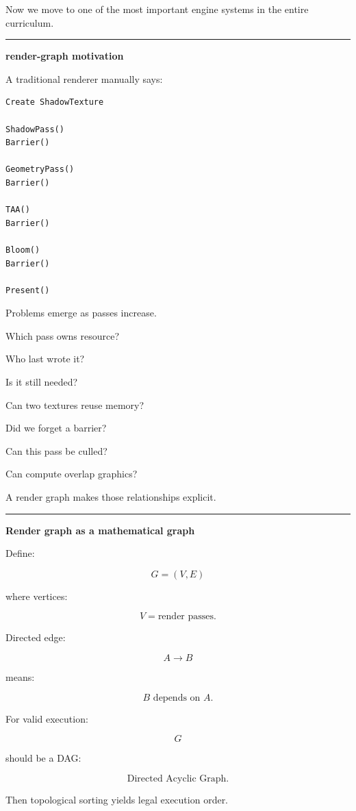 Now we move to one of the most important engine systems in the entire curriculum.

\begin{center}\rule{0.5\linewidth}{0.5pt}\end{center}

\textbf{render-graph motivation}

A traditional renderer manually says:

\begin{verbatim}
Create ShadowTexture

ShadowPass()
Barrier()

GeometryPass()
Barrier()

TAA()
Barrier()

Bloom()
Barrier()

Present()
\end{verbatim}

Problems emerge as passes increase.

Which pass owns resource?

Who last wrote it?

Is it still needed?

Can two textures reuse memory?

Did we forget a barrier?

Can this pass be culled?

Can compute overlap graphics?

A render graph makes those relationships explicit.

\begin{center}\rule{0.5\linewidth}{0.5pt}\end{center}

\textbf{Render graph as a mathematical graph}

Define:

\[
G=(V,E)
\]

where vertices:

\[
V=
\text{render passes}.
\]

Directed edge:

\[
A\rightarrow B
\]

means:

\[
\boxed{
B\text{ depends on }A.
}
\]

For valid execution:

\[
G
\]

should be a DAG:

\[
\boxed{
\text{Directed Acyclic Graph}.
}
\]

Then topological sorting yields legal execution order.

